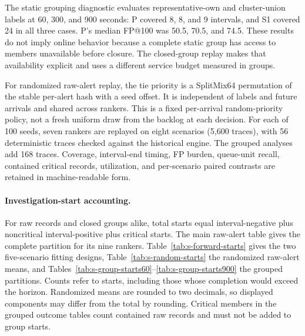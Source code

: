 The static grouping diagnostic evaluates representative-own and cluster-union labels at 60, 300, and 900 seconds: P covered 8, 8, and 9 intervals, and S1\key{} covered 24 in all three cases. P's median FP@100 was 50.5, 70.5, and 74.5. These results do not imply online behavior because a complete static group has access to members unavailable before closure. The closed-group replay makes that availability explicit and uses a different service budget measured in groups.

For randomized raw-alert replay, the tie priority is a SplitMix64 permutation of the stable per-alert hash with a seed offset. It is independent of labels and future arrivals and shared across rankers. This is a fixed per-arrival random-priority policy, not a fresh uniform draw from the backlog at each decision. For each of 100 seeds, seven rankers are replayed on eight scenarios (5,600 traces), with 56 deterministic traces checked against the historical engine. The grouped analyses add 168 traces. Coverage, interval-end timing, FP burden, queue-unit recall, contained critical records, utilization, and per-scenario paired contrasts are retained in machine-readable form.

\FloatBarrier
\paragraph{Investigation-start accounting.}
For raw records and closed groups alike, total starts equal interval-negative plus noncritical interval-positive plus critical starts. The main raw-alert table gives the complete partition for its nine rankers. Table~\ref{tab:s-forward-starts} gives the two five-scenario fitting designs, Table~\ref{tab:s-random-starts} the randomized raw-alert means, and Tables~\ref{tab:s-group-starts60}--\ref{tab:s-group-starts900} the grouped partitions. Counts refer to starts, including those whose completion would exceed the horizon. Randomized means are rounded to two decimals, so displayed components may differ from the total by rounding. Critical members in the grouped outcome tables count contained raw records and must not be added to group starts.


